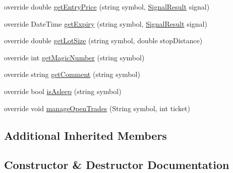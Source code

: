 \begin{DoxyCompactItemize}
\item 
override double \hyperlink{class_m_q_l4_c_sharp_1_1_user_defined_1_1_strategy_1_1_ma_cross_strategy_a07d6b1bb51cb7771c833cb7a81e596ae}{get\+Entry\+Price} (string symbol, \hyperlink{class_m_q_l4_c_sharp_1_1_base_1_1_common_1_1_signal_result}{Signal\+Result} signal)
\item 
override Date\+Time \hyperlink{class_m_q_l4_c_sharp_1_1_user_defined_1_1_strategy_1_1_ma_cross_strategy_adce2f73c62061d39733faed8be7b65a0}{get\+Expiry} (string symbol, \hyperlink{class_m_q_l4_c_sharp_1_1_base_1_1_common_1_1_signal_result}{Signal\+Result} signal)
\item 
override double \hyperlink{class_m_q_l4_c_sharp_1_1_user_defined_1_1_strategy_1_1_ma_cross_strategy_a07b8bf3991255884885fe828e94ae0f0}{get\+Lot\+Size} (string symbol, double stop\+Distance)
\item 
override int \hyperlink{class_m_q_l4_c_sharp_1_1_user_defined_1_1_strategy_1_1_ma_cross_strategy_ab82d88a0f265142556a939e62686b2c1}{get\+Magic\+Number} (string symbol)
\item 
override string \hyperlink{class_m_q_l4_c_sharp_1_1_user_defined_1_1_strategy_1_1_ma_cross_strategy_a7c406e0e0320f5cd69556e7ef450eba2}{get\+Comment} (string symbol)
\item 
override bool \hyperlink{class_m_q_l4_c_sharp_1_1_user_defined_1_1_strategy_1_1_ma_cross_strategy_ab79c49cd373b1f7a00dc4f5900c54725}{is\+Asleep} (string symbol)
\item 
override void \hyperlink{class_m_q_l4_c_sharp_1_1_user_defined_1_1_strategy_1_1_ma_cross_strategy_ae511e9a70d297cd5e4279ca036dd0a46}{manage\+Open\+Trades} (String symbol, int ticket)
\end{DoxyCompactItemize}
\subsection*{Additional Inherited Members}


\subsection{Constructor \& Destructor Documentation}
